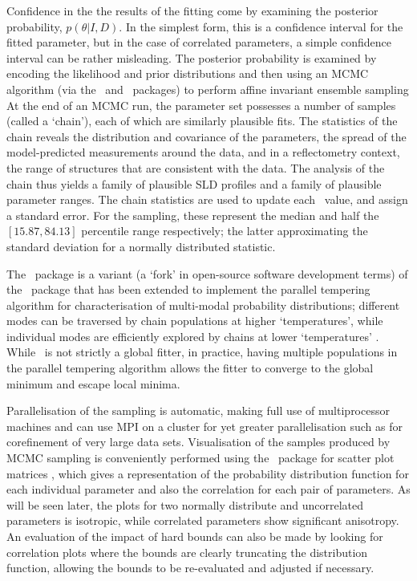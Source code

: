 \documentclass[pdf,preprint]{iucr}
\begin{document}
Confidence in the the results of the fitting come by examining the posterior probability, $p(\theta | I, D)$. In the simplest form, this is a confidence interval for the fitted parameter, but in the case of correlated parameters, a simple confidence interval can be rather misleading. The posterior probability is examined by encoding the likelihood and prior distributions and then using an MCMC algorithm (via the \emcee\ and \ptemcee\ packages) to perform affine invariant ensemble sampling \cite{emcee, ptemcee}
At the end of an MCMC run, the parameter set possesses a number of samples (called a `chain'), each of which are similarly plausible fits.
The statistics of the chain reveals the distribution and covariance of the parameters, the spread of the model-predicted measurements around the data, and in a reflectometry context, the range of structures that are consistent with the data.
The analysis of the chain thus yields a family of plausible SLD profiles and a family of plausible parameter ranges.
The chain statistics are used to update each \Parameter\ value, and assign a standard error. For the sampling, these represent the median and half the $[15.87, 84.13]$ percentile range respectively; the latter approximating the standard deviation for a normally distributed statistic.

The \ptemcee\ package is a variant (a `fork' in open-source software development terms) of the \emcee\ package that has been extended to implement the parallel tempering algorithm for characterisation of multi-modal probability distributions; different modes can be traversed by chain populations at higher `temperatures', while individual modes are efficiently explored by chains at lower `temperatures' \cite{ptemcee}. While \ptemcee\ is not strictly a global fitter, in practice, having multiple populations in the parallel tempering algorithm allows the fitter to converge to the global minimum and escape local minima.

Parallelisation of the sampling is automatic, making full use of multiprocessor machines and can use MPI on a cluster for yet greater parallelisation such as for corefinement of very large data sets. Visualisation of the samples produced by MCMC sampling is conveniently performed using the \corner\ package for scatter plot matrices \cite{corner}, which gives a representation of the probability distribution function for each individual parameter and also the correlation for each pair of parameters. As will be seen later, the plots for two normally distribute and uncorrelated parameters is isotropic, while correlated parameters show significant anisotropy. An evaluation of the impact of hard bounds can also be made by looking for correlation plots where the bounds are clearly truncating the distribution function, allowing the bounds to be re-evaluated and adjusted if necessary.
\end{document}
